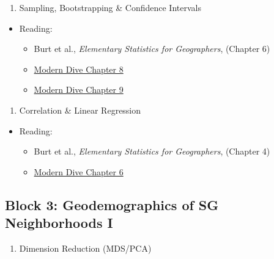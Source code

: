 \documentclass[]{book}
\providecommand{\tightlist}{%
  \setlength{\itemsep}{0pt}\setlength{\parskip}{0pt}}
\begin{document}
\begin{enumerate}
\def\labelenumi{\arabic{enumi}.}
\setcounter{enumi}{2}
\tightlist
\item
  Sampling, Bootstrapping \& Confidence Intervals
\end{enumerate}

\begin{itemize}
\tightlist
\item
  Reading:

  \begin{itemize}
  \tightlist
  \item
    Burt et al., \emph{Elementary Statistics for Geographers}, (Chapter 6)
  \item
    \href{https://moderndive.com/8-sampling.html}{Modern Dive Chapter 8}
  \item
    \href{https://moderndive.com/9-confidence-intervals.html}{Modern Dive Chapter 9}
  \end{itemize}
\end{itemize}

\begin{enumerate}
\def\labelenumi{\arabic{enumi}.}
\setcounter{enumi}{3}
\tightlist
\item
  Correlation \& Linear Regression
\end{enumerate}

\begin{itemize}
\tightlist
\item
  Reading:

  \begin{itemize}
  \tightlist
  \item
    Burt et al., \emph{Elementary Statistics for Geographers}, (Chapter 4)
  \item
    \href{https://moderndive.com/6-regression.html}{Modern Dive Chapter 6}
  \end{itemize}
\end{itemize}

\hypertarget{block-3-geodemographics-of-sg-neighborhoods-i}{%
\subsection{Block 3: Geodemographics of SG Neighborhoods I}\label{block-3-geodemographics-of-sg-neighborhoods-i}}

\begin{enumerate}
\def\labelenumi{\arabic{enumi}.}
\setcounter{enumi}{4}
\tightlist
\item
  Dimension Reduction (MDS/PCA)
\end{enumerate}
\end{document}
